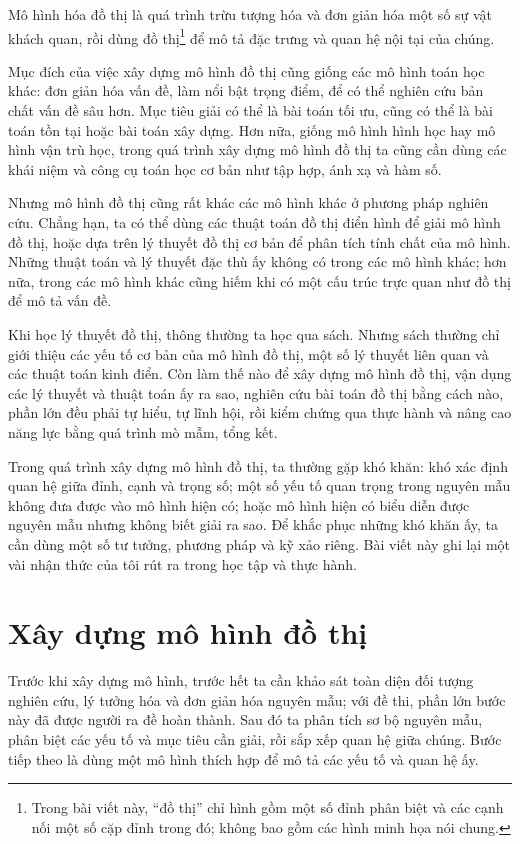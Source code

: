 \documentclass[11pt]{article}
\begin{document}
Mô hình hóa đồ thị là quá trình trừu tượng hóa và đơn giản hóa một số sự vật
khách quan, rồi dùng đồ thị\footnote{Trong bài viết này, ``đồ thị'' chỉ hình
gồm một số đỉnh phân biệt và các cạnh nối một số cặp đỉnh trong đó; không bao
gồm các hình minh họa nói chung.} để mô tả đặc trưng và quan hệ nội tại của
chúng.

Mục đích của việc xây dựng mô hình đồ thị cũng giống các mô hình toán học
khác: đơn giản hóa vấn đề, làm nổi bật trọng điểm, để có thể nghiên cứu bản
chất vấn đề sâu hơn. Mục tiêu giải có thể là bài toán tối ưu, cũng có thể là
bài toán tồn tại hoặc bài toán xây dựng. Hơn nữa, giống mô hình hình học hay
mô hình vận trù học, trong quá trình xây dựng mô hình đồ thị ta cũng cần dùng
các khái niệm và công cụ toán học cơ bản như tập hợp, ánh xạ và hàm số.

Nhưng mô hình đồ thị cũng rất khác các mô hình khác ở phương pháp nghiên cứu.
Chẳng hạn, ta có thể dùng các thuật toán đồ thị điển hình để giải mô hình đồ
thị, hoặc dựa trên lý thuyết đồ thị cơ bản để phân tích tính chất của mô
hình. Những thuật toán và lý thuyết đặc thù ấy không có trong các mô hình
khác; hơn nữa, trong các mô hình khác cũng hiếm khi có một cấu trúc trực quan
như đồ thị để mô tả vấn đề.

Khi học lý thuyết đồ thị, thông thường ta học qua sách. Nhưng sách thường chỉ
giới thiệu các yếu tố cơ bản của mô hình đồ thị, một số lý thuyết liên quan
và các thuật toán kinh điển. Còn làm thế nào để xây dựng mô hình đồ thị, vận
dụng các lý thuyết và thuật toán ấy ra sao, nghiên cứu bài toán đồ thị bằng
cách nào, phần lớn đều phải tự hiểu, tự lĩnh hội, rồi kiểm chứng qua thực
hành và nâng cao năng lực bằng quá trình mò mẫm, tổng kết.

Trong quá trình xây dựng mô hình đồ thị, ta thường gặp khó khăn: khó xác định
quan hệ giữa đỉnh, cạnh và trọng số; một số yếu tố quan trọng trong nguyên
mẫu không đưa được vào mô hình hiện có; hoặc mô hình hiện có biểu diễn được
nguyên mẫu nhưng không biết giải ra sao. Để khắc phục những khó khăn ấy, ta
cần dùng một số tư tưởng, phương pháp và kỹ xảo riêng. Bài viết này ghi lại
một vài nhận thức của tôi rút ra trong học tập và thực hành.

\section{Xây dựng mô hình đồ thị}

Trước khi xây dựng mô hình, trước hết ta cần khảo sát toàn diện đối tượng
nghiên cứu, lý tưởng hóa và đơn giản hóa nguyên mẫu; với đề thi, phần lớn
bước này đã được người ra đề hoàn thành. Sau đó ta phân tích sơ bộ nguyên
mẫu, phân biệt các yếu tố và mục tiêu cần giải, rồi sắp xếp quan hệ giữa
chúng. Bước tiếp theo là dùng một mô hình thích hợp để mô tả các yếu tố và
quan hệ ấy.
\end{document}
